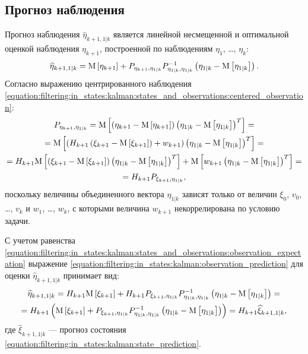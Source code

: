 \subsection{Прогноз наблюдения}

Прогноз наблюдения $\widehat{\eta}_{k+1,1|k}$ является линейной несмещенной и оптимальной оценкой наблюдения $\eta_{k+1}$, построенной по наблюдениям $\eta_1$, \dots, $\eta_k$:
\begin{equation} \label{equation:filtering:in_states:kalman:observation_prediction}
	\widehat{\eta}_{k+1, 1|k} = \mathrm{M} \left [ \eta_{k+1} \right ] + P_{\eta_{k+1}, \eta_{1|k}} P_{\eta_{1|k}, \eta_{1|k}}^{-1} \left ( \eta_{1|k} - \mathrm{M} \left [ \eta_{1|k} \right ] \right ) .
\end{equation}
Согласно выражению центрированного наблюдения \eqref{equation:filtering:in_states:kalman:states_and_observations:centered_observation}:
\begin{multline*}
	P_{\eta_{k+1}, \eta_{1|k}}
		= \mathrm{M} \left [ \left ( \eta_{k+1} - \mathrm{M} \left [ \eta_{k+1} \right ] \right ) \left ( \eta_{1|k} - \mathrm{M} \left [ \eta_{1|k} \right ] \right )^T \right ] = \\
	= \mathrm{M} \left [ \left ( H_{k+1} \left ( \xi_{k+1} - \mathrm{M} \left [ \xi_{k+1} \right ] \right ) + w_{k+1} \right ) \left ( \eta_{1|k} - \mathrm{M} \left [ \eta_{1|k} \right ] \right )^T \right ] = \\
	= H_{k+1} \mathrm{M} \left [ \left ( \xi_{k+1} - \mathrm{M} \left [ \xi_{k+1} \right ] \right ) \left ( \eta_{1|k} - \mathrm{M} \left [ \eta_{1|k} \right ] \right )^T \right ] + \mathrm{M} \left [ w_{k+1} \left ( \eta_{1|k} - \mathrm{M} \left [ \eta_{1|k} \right ] \right )^T \right ] = \\
	= H_{k+1} P_{\xi_{k+1}, \eta_{1|k}}
	,
\end{multline*}
поскольку величины объединенного вектора $\eta_{1|k}$ зависят только от величин $\xi_0$, $v_0$, \dots, $v_k$ и $w_1$, \dots, $w_k$, с которыми величина $w_{k+1}$
некоррелирована по условию задачи.

С учетом равенства \eqref{equation:filtering:in_states:kalman:states_and_observations:observation_expectation} выражение
\eqref{equation:filtering:in_states:kalman:observation_prediction} для оценки $\widehat{\eta}_{k+1,1|k}$ принимает вид:
\begin{multline} \label{equation:filtering:in_states:kalman:observation_prediction:recursion}
	\widehat{\eta}_{k+1, 1|k}
		= H_{k+1} \mathrm{M} \left [ \xi_{k+1} \right ] + H_{k+1} P_{\xi_{k+1}, \eta_{1|k}} P_{\eta_{1|k}, \eta_{1|k}}^{-1} \left ( \eta_{1|k} - \mathrm{M} \left [ \eta_{1|k} \right ] \right ) = \\
	= H_{k+1} \left ( \mathrm{M} \left [ \xi_{k+1} \right ] + P_{\xi_{k+1}, \eta_{1|k}} P_{\eta_{1|k}, \eta_{1|k}}^{-1} \left ( \eta_{1|k} - \mathrm{M} \left [ \eta_{1|k} \right ] \right ) \right )
		= H_{k+1} \widehat{\xi}_{k+1,1|k}
	,
\end{multline}
где $\widehat{\xi}_{k+1,1|k}$ --- прогноз состояния \eqref{equation:filtering:in_states:kalman:state_prediction}.

